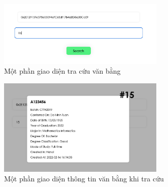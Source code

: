 \begin{figure}[!ht]
    \centering
    \includegraphics[width=300px]{images/app-look-up-cert.png}
    \caption{Một phần giao diện tra cứu văn bằng}
\end{figure}

\begin{figure}[!ht]
    \centering
    \includegraphics[width=300px]{images/app-look-up-cert-found.png}
    \caption{Một phần giao diện thông tin văn bằng khi tra cứu}
\end{figure}